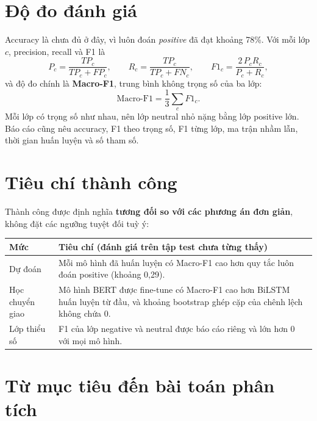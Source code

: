 \section{Độ đo đánh giá}
\label{sec:2-4}

Accuracy là chưa đủ ở đây, vì luôn đoán \emph{positive} đã đạt khoảng 78\%. Với mỗi lớp $c$, precision, recall và F1 là
\begin{equation*}
    P_c = \frac{TP_c}{TP_c+FP_c},\qquad
    R_c = \frac{TP_c}{TP_c+FN_c},\qquad
    F1_c = \frac{2\,P_c R_c}{P_c+R_c},
\end{equation*}
và độ đo chính là \textbf{Macro-F1}, trung bình không trọng số của ba lớp:
\begin{equation*}
    \text{Macro-F1} = \frac{1}{3}\sum_{c} F1_c .
\end{equation*}
Mỗi lớp có trọng số như nhau, nên lớp neutral nhỏ nặng bằng lớp positive lớn. Báo cáo cũng nêu accuracy, F1 theo trọng số, F1 từng lớp, ma trận nhầm lẫn, thời gian huấn luyện và số tham số.

\section{Tiêu chí thành công}
\label{sec:2-5}

Thành công được định nghĩa \textbf{tương đối so với các phương án đơn giản}, không đặt các ngưỡng tuyệt đối tuỳ ý:

\begin{center}
\begin{tabular}{@{}p{3cm}p{11.5cm}@{}}
    \toprule
    Mức & Tiêu chí (đánh giá trên tập test chưa từng thấy) \\
    \midrule
    Dự đoán & Mỗi mô hình đã huấn luyện có Macro-F1 cao hơn quy tắc luôn đoán positive (khoảng 0,29). \\
    Học chuyển giao & Mô hình BERT được fine-tune có Macro-F1 cao hơn BiLSTM huấn luyện từ đầu, và khoảng bootstrap ghép cặp của chênh lệch không chứa 0. \\
    Lớp thiểu số & F1 của lớp negative và neutral được báo cáo riêng và lớn hơn 0 với mọi mô hình. \\
    \bottomrule
\end{tabular}
\end{center}

\section{Từ mục tiêu đến bài toán phân tích}
\label{sec:2-6}


